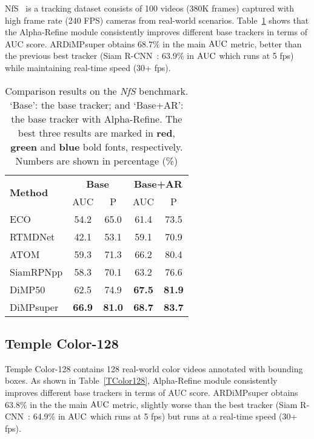 \documentclass[final]{cvpr}
\begin{document}
{\begin{appendices}
NfS~\cite{NFS} is a tracking dataset consists of 100 videos (380K frames) captured with high frame rate (240 FPS) cameras from real-world scenarios. Table~\ref{NfS} shows that the Alpha-Refine module consistently improves different base trackers in terms of AUC score. ARDiMPsuper obtains $68.7\%$ in the main $\rm{AUC}$ metric, better than the previous best tracker (Siam R-CNN~\cite{SiamRCNN}: 63.9\% in $\rm{AUC}$ which runs at 5 fps) while maintaining real-time speed (30+ fps). 

\begin{table}[htbp]
\caption{Comparison results on the \textit{NfS} benchmark. 
    `Base': the base tracker; and `Base+AR': the base tracker with Alpha-Refine. 
    The best three results are marked in \textbf{\textcolor[rgb]{1,0,0}{red}}, \textbf{\textcolor[rgb]{0,1,0}{green}} and \textbf{\textcolor[rgb]{0,0,1}{blue}} bold fonts, respectively. Numbers are shown in percentage (\%)  \label{NfS}}
\begin{center}
\begin{tabular}{l|c|c|c|c}
\hline
\multirow{2}{*}{\textbf{Method}}  &\multicolumn{2}{c|}{\textbf{Base}}   &\multicolumn{2}{c}{\textbf{Base+AR}} \\
\cline{2-5}
    	     &AUC   &P 	    &AUC   &P 	 \\
\hline
ECO         &54.2 &65.0 &61.4 &73.5 \\
RTMDNet     &42.1 &53.1 &59.1 &70.9 \\
ATOM        &59.3 &71.3 &66.2 &80.4 \\
SiamRPNpp   &58.3 &70.1 &63.2 &76.6 \\
DiMP50      &62.5 &74.9 &\textbf{\textcolor[rgb]{0,1,0}{67.5}} &\textbf{\textcolor[rgb]{0,1,0}{81.9}} \\
DiMPsuper   &\textbf{\textcolor[rgb]{0,0,1}{66.9}} &\textbf{\textcolor[rgb]{0,0,1}{81.0}} &\textbf{\textcolor[rgb]{1,0,0}{68.7}} &\textbf{\textcolor[rgb]{1,0,0}{83.7}} \\

\hline
\end{tabular}
\end{center}
\vspace{-6mm}
\end{table}



\subsection{Temple Color-128}
Temple Color-128\cite{TC128} contains 128 real-world color videos annotated with bounding boxes. As shown in Table~\ref{TColor128}, Alpha-Refine module consistently improves different base trackers in terms of AUC score. ARDiMPsuper obtains $63.8\%$ in the the main $\rm{AUC}$ metric, slightly worse than the best tracker (Siam R-CNN~\cite{SiamRCNN}: 64.9\% in $\rm{AUC}$ which runs at 5 fps) but runs at a real-time speed (30+ fps). 


\end{appendices}}
\end{document}
